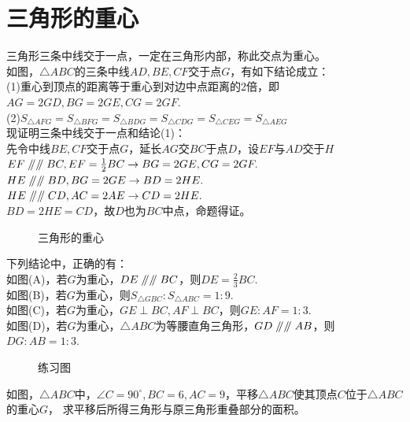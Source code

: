 \section{三角形的重心}
\begin{theorem}
    三角形三条中线交于一点，一定在三角形内部，称此交点为重心。\\
    如图，$\triangle ABC$的三条中线$AD,BE,CF$交于点$G$，有如下结论成立：\\
    (1)重心到顶点的距离等于重心到对边中点距离的2倍，即$AG=2GD,BG=2GE,CG=2GF$. \\
    (2)$S_{\triangle AFG}=S_{\triangle BFG}=S_{\triangle BDG}=S_{\triangle CDG}=S_{\triangle CEG}=S_{\triangle AEG}$ \\
    现证明三条中线交于一点和结论(1)： \\
    先令中线$BE,CF$交于点$G$，延长$AG$交$BC$于点$D$，设$EF$与$AD$交于$H$\\
    $EF\mathrel{/\mkern-5mu/} \mathrel{/\mkern-5mu/} BC,EF=\frac{1}{2}BC \rightarrow BG=2GE,CG=2GF.$ \\
    $HE\mathrel{/\mkern-5mu/} \mathrel{/\mkern-5mu/} BD,BG=2GE \rightarrow BD=2HE.$ \\
    $HE\mathrel{/\mkern-5mu/} \mathrel{/\mkern-5mu/} CD,AC=2AE \rightarrow CD=2HE.$ \\
    $BD=2HE=CD$，故$D$也为$BC$中点，命题得证。\\
\end{theorem}
\begin{figure}[H]
    \centering
    \resizebox{4cm}{!}{}
    \caption{三角形的重心}
\end{figure}
\begin{problem}
下列结论中，正确的有：\\
如图(A)，若$G$为重心，$DE\mathrel{/\mkern-5mu/} \mathrel{/\mkern-5mu/} BC$，则$DE=\frac{2}{3}BC$. \\
如图(B)，若$G$为重心，则$S_{\triangle GBC}:S_{\triangle ABC}=1:9$. \\
如图(C)，若$G$为重心，$GE\perp BC,AF\perp BC$，则$GE:AF=1:3$. \\
如图(D)，若$G$为重心，$\triangle ABC$为等腰直角三角形，$GD\mathrel{/\mkern-5mu/} \mathrel{/\mkern-5mu/} AB$，则$DG:AB=1:3$. \\
\end{problem}
\begin{figure}[H]
    \centering
    \resizebox{12cm}{!}{}
    \caption{练习图}
\end{figure}
\begin{problem}
如图，$\triangle ABC$中，$\angle C=90^\circ,BC=6,AC=9$，平移$\triangle ABC$使其顶点$C$位于$\triangle ABC$的重心$G$，
求平移后所得三角形与原三角形重叠部分的面积。
\end{problem}
